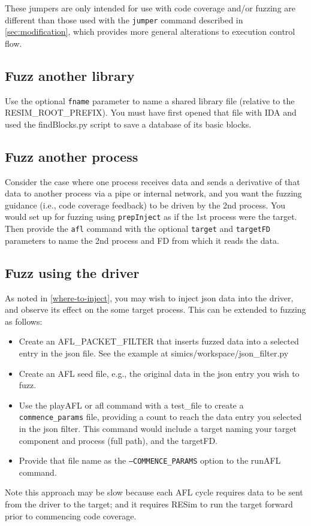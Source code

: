 \documentclass[titlepage]{article}
\begin{document}
These jumpers are only intended for use with code coverage and/or fuzzing are different than those used with the {\tt jumper} command described
in \ref{sec:modification},
which provides more general alterations to execution control flow.

\subsection{Fuzz another library}
Use the optional {\tt fname} parameter to name a shared library file (relative to the RESIM\_ROOT\_PREFIX).  You must have first
opened that file with IDA and used the findBlocks.py script to save a database of its basic blocks.

\subsection{Fuzz another process}
Consider the case where one process receives data and sends a derivative of that data to another process via a pipe or internal network,
and you want the fuzzing guidance (i.e., code coverage feedback) to be driven by the 2nd process.  You would set up for fuzzing using
{\tt prepInject} as if the 1st process were the target.  Then provide the {\tt afl} command with the optional {\tt target} and {\tt targetFD}
parameters to name the 2nd process and FD from which it reads the data.

\subsection{Fuzz using the driver}
As noted in \ref{where-to-inject}, you may wish to inject json data into the driver, and observe its effect on the some target process.
This can be extended to fuzzing as follows:
\begin{itemize}
\item Create an AFL\_PACKET\_FILTER that inserts fuzzed data into a selected entry in the json file.  See the example at simics/workspace/json\_filter.py
\item Create an AFL seed file, e.g., the original data in the json entry you wish to fuzz.
\item Use the playAFL or afl command with a test\_file to create a {\tt commence\_params} file, providing a count to reach the data entry you selected in the json filter.
This command would include a target naming your target component and process (full path), and the targetFD.
\item Provide that file name as the {\tt --COMMENCE\_PARAMS} option to the runAFL command.
\end{itemize}
Note this approach may be slow because each AFL cycle requires data to be sent from the driver to the target; and it requires RESim to run the target forward 
prior to commencing code coverage.
\end{document}
